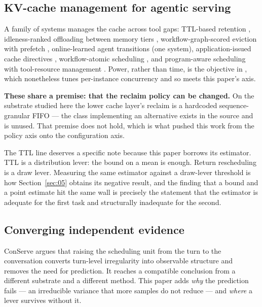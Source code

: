 \subsection{KV-cache management for agentic serving}

A family of systems manages the cache across tool gaps: TTL-based retention \cite{continuum2025}, idleness-ranked offloading between memory tiers \cite{mori2026}, workflow-graph-scored eviction with prefetch \cite{kvflow2025}, online-learned agent transitions \cite{cachescout2026a,cachescout2026b} (one system), application-issued cache directives \cite{leyline2026}, workflow-atomic scheduling \cite{saga2026}, and program-aware scheduling with tool-resource management \cite{thunderagent2026}. Power, rather than time, is the objective in \cite{kairos2026}, which nonetheless tunes per-instance concurrency and so meets this paper's axis.

\textbf{These share a premise: that the reclaim policy can be changed.} On the substrate studied here the lower cache layer's reclaim is a hardcoded sequence-granular FIFO --- the class implementing an alternative exists in the source and is unused. That premise does not hold, which is what pushed this work from the policy axis onto the configuration axis.

The TTL line deserves a specific note because this paper borrows its estimator. TTL is a distribution lever: the bound on a mean is enough. Return rescheduling is a draw lever. Measuring the same estimator against a draw-lever threshold is how Section~\ref{sec:05} obtains its negative result, and the finding that a bound and a point estimate hit the same wall is precisely the statement that the estimator is adequate for the first task and structurally inadequate for the second.

\subsection{Converging independent evidence}

ConServe \cite{conserve2026} argues that raising the scheduling unit from the turn to the conversation converts turn-level irregularity into observable structure and removes the need for prediction. It reaches a compatible conclusion from a different substrate and a different method. This paper adds \emph{why} the prediction fails --- an irreducible variance that more samples do not reduce --- and \emph{where} a lever survives without it.

